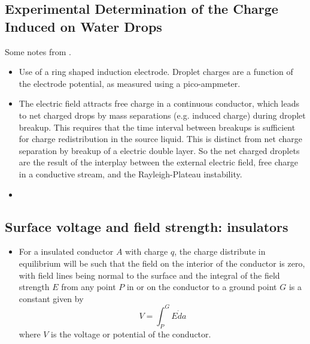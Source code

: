 \documentclass{jfm}
\begin{document}
\subsection{Experimental Determination of the Charge Induced on Water Drops}
Some notes from \citep{magarvey_experimental_1962}.
\begin{itemize}
\item Use of a ring shaped induction electrode. Droplet charges are a function of the electrode potential, as measured using a pico-ampmeter.
\item The electric field attracts free charge in a continuous conductor, which leads to net charged drops by mass separations (e.g. induced charge) during droplet breakup. This requires that the time interval between breakups is sufficient for charge redistribution in the source liquid. This is distinct from net charge separation by breakup of a electric double layer. So the net charged droplets are the result of the interplay between the external electric field, free charge in a conductive stream, and the Rayleigh-Plateau instability.
\item 
\end{itemize}

\subsection{Surface voltage and field strength: insulators}
\begin{itemize}
\item For a insulated conductor $A$ with charge $q$, the charge distribute in equilibrium will be such that the field on the interior of the conductor is zero, with field lines being normal to the surface and the integral of the field strength $E$ from any point $P$ in or on the conductor to a ground point $G$ is a constant given by
\[ V = \int^G_P E \dot da \]
where $V$ is the voltage or potential of the conductor.

\end{itemize}




\end{document}
